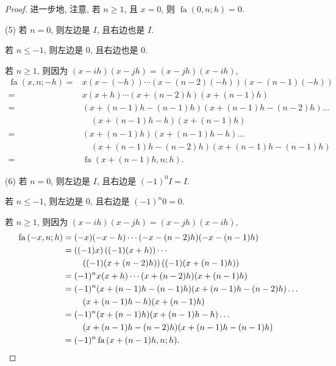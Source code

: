 \documentclass[../libro.tex]{subfiles}
\begin{document}
\begin{proof}
    进一步地, 注意,
    若 \(n \geq 1\), 且 \(x = 0\),
    则 \(\operatorname{fa} {(0, n; h)} = 0\).

    (5)
    若 \(n = 0\), 则左边是 \(I\),
    且右边也是 \(I\).

    若 \(n \leq -1\), 则左边是 \(0\),
    且右边也是 \(0\).

    若 \(n \geq 1\), 则因为
    \((x - i h) (x - j h) = (x - j h) (x - i h)\),
    \begin{align*}
        \operatorname{fa} {(x, n; -h)}
        = {} &
        x (x - (-h)) \cdots (x - (n-2)(-h)) (x - (n-1)(-h))
        \\
        = {} &
        x (x + h) \cdots (x + (n-2)h) (x + (n-1)h)
        \\
        = {} &
        (x + (n-1)h - (n-1)h) (x + (n-1)h - (n-2)h) \dots
        \\
        & \quad
        (x + (n-1)h - h) (x + (n-1)h)
        \\
        = {} &
        (x + (n-1)h) (x + (n-1)h - h) \dots
        \\
        & \quad
        (x + (n-1)h - (n-2)h) (x + (n-1)h - (n-1)h)
        \\
        = {} &
        \operatorname{fa} {(x + (n-1)h, n; h)}.
    \end{align*}

    (6)
    若 \(n = 0\), 则左边是 \(I\),
    且右边是 \((-1)^0 I = I\).

    若 \(n \leq -1\), 则左边是 \(0\),
    且右边是 \((-1)^n 0 = 0\).

    若 \(n \geq 1\), 则因为
    \((x - i h) (x - j h) = (x - j h) (x - i h)\),
    \begin{align*}
        \operatorname{fa} {(-x, n; h)}
        = {} &
        (-x) (-x - h) \cdots (-x - (n-2)h) (-x - (n-1)h)
        \\
        = {} &
        ((-1) x)\, ((-1) (x + h)) \cdots
        \\
        & \quad
        ((-1) (x + (n-2)h))\, ((-1) (x + (n-1)h))
        \\
        = {} &
        (-1)^n
        x (x + h) \cdots (x + (n-2)h) (x + (n-1)h)
        \\
        = {} &
        (-1)^n
        (x + (n-1)h - (n-1)h) (x + (n-1)h - (n-2)h) \dots
        \\
        & \quad
        (x + (n-1)h - h) (x + (n-1)h)
        \\
        = {} &
        (-1)^n
        (x + (n-1)h) (x + (n-1)h - h) \dots
        \\
        & \quad
        (x + (n-1)h - (n-2)h) (x + (n-1)h - (n-1)h)
        \\
        = {} &
        (-1)^n \operatorname{fa} {(x + (n-1)h, n; h)}.
        \qedhere
    \end{align*}
\end{proof}
\end{document}
